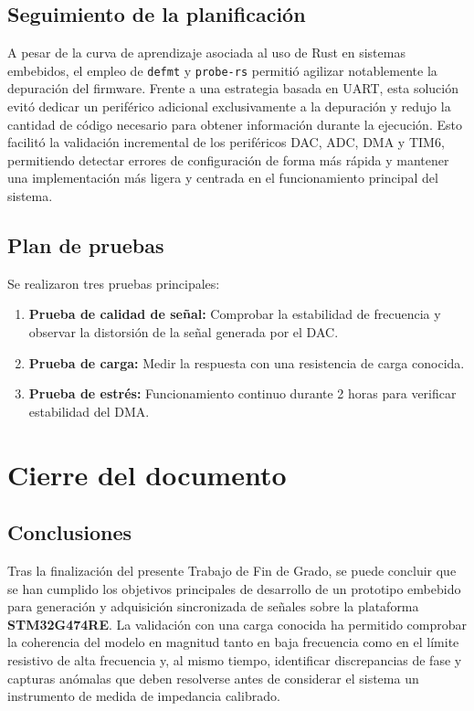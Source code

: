 \documentclass[11pt,a4paper]{article}
\begin{document}
\subsection{Seguimiento de la planificación}
A pesar de la curva de aprendizaje asociada al uso de Rust en sistemas embebidos, el empleo de \texttt{defmt} y \texttt{probe-rs} permitió agilizar notablemente la depuración del firmware. Frente a una estrategia basada en UART, esta solución evitó dedicar un periférico adicional exclusivamente a la depuración y redujo la cantidad de código necesario para obtener información durante la ejecución. Esto facilitó la validación incremental de los periféricos DAC, ADC, DMA y TIM6, permitiendo detectar errores de configuración de forma más rápida y mantener una implementación más ligera y centrada en el funcionamiento principal del sistema.

\subsection{Plan de pruebas}
Se realizaron tres pruebas principales:
\begin{enumerate}
    \item \textbf{Prueba de calidad de señal:} Comprobar la estabilidad de frecuencia y observar la distorsión de la señal generada por el DAC.
    \item \textbf{Prueba de carga:} Medir la respuesta con una resistencia de carga conocida.
    \item \textbf{Prueba de estrés:} Funcionamiento continuo durante 2 horas para verificar estabilidad del DMA.
\end{enumerate}

\section{Cierre del documento}

\subsection{Conclusiones}

Tras la finalización del presente Trabajo de Fin de Grado, se puede concluir que se han cumplido los objetivos principales de desarrollo de un prototipo embebido para generación y adquisición sincronizada de señales sobre la plataforma \textbf{STM32G474RE}. La validación con una carga conocida ha permitido comprobar la coherencia del modelo en magnitud tanto en baja frecuencia como en el límite resistivo de alta frecuencia y, al mismo tiempo, identificar discrepancias de fase y capturas anómalas que deben resolverse antes de considerar el sistema un instrumento de medida de impedancia calibrado.
\end{document}
